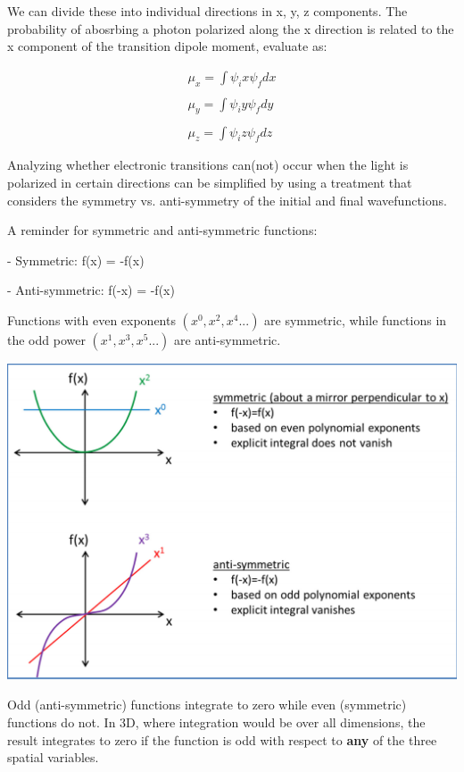 \documentclass[12pt, letterpaper]{article}
\begin{document}
\newpage
We can divide these into individual directions in x, y, z components. The probability of abosrbing a photon polarized along the x direction is related to the x component of the transition dipole moment, evaluate
as: 

\begin{align*}
    \mu_x = \int \psi_ix\psi_fdx \\ \\ 
    \mu_y = \int \psi_iy\psi_fdy \\ \\ 
    \mu_z = \int \psi_iz\psi_fdz  
\end{align*}

Analyzing whether electronic transitions can(not) occur when the light 
is polarized in certain directions can be simplified by using a treatment that 
considers the symmetry vs. anti-symmetry of the initial and final wavefunctions. 

A reminder for symmetric and anti-symmetric functions: 

- Symmetric: f(x) = -f(x) 

- Anti-symmetric: f(-x) = -f(x)

Functions with even exponents \( (x^0, x^2, x^4...) \) are symmetric, while functions in the odd power \( (x^1, x^3, x^5...) \) 
are anti-symmetric. 

\begin{center}
    \includegraphics[scale = 0.5]{symmetry.png}
\end{center}

Odd (anti-symmetric) functions integrate to zero while even (symmetric) functions do not. 
In 3D, where integration would be over all dimensions, the result integrates to zero if the function is odd with respect to \textbf{any} of the three 
spatial variables. 
\end{document}
